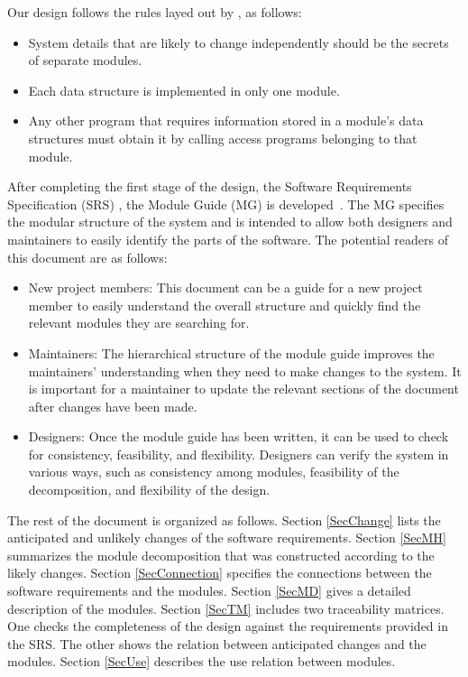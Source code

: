 \documentclass[12pt, titlepage]{article}
\begin{document}
Our design follows the rules layed out by \citet{ParnasEtAl1984}, as follows:
\begin{itemize}
\item System details that are likely to change independently should be the
  secrets of separate modules.
\item Each data structure is implemented in only one module.
\item Any other program that requires information stored in a module's data
  structures must obtain it by calling access programs belonging to that module.
\end{itemize}

After completing the first stage of the design, the Software Requirements
Specification (SRS) \citep{SRS-Sanskrit-Ciphers}, the Module Guide (MG) is developed~\citep{ParnasEtAl1984}. The MG
specifies the modular structure of the system and is intended to allow both
designers and maintainers to easily identify the parts of the software.  The
potential readers of this document are as follows:

\begin{itemize}
\item New project members: This document can be a guide for a new project member
  to easily understand the overall structure and quickly find the
  relevant modules they are searching for.
\item Maintainers: The hierarchical structure of the module guide improves the
  maintainers' understanding when they need to make changes to the system. It is
  important for a maintainer to update the relevant sections of the document
  after changes have been made.
\item Designers: Once the module guide has been written, it can be used to
  check for consistency, feasibility, and flexibility. Designers can verify the
  system in various ways, such as consistency among modules, feasibility of the
  decomposition, and flexibility of the design.
\end{itemize}

The rest of the document is organized as follows. Section
\ref{SecChange} lists the anticipated and unlikely changes of the software
requirements. Section \ref{SecMH} summarizes the module decomposition that
was constructed according to the likely changes. Section \ref{SecConnection}
specifies the connections between the software requirements and the
modules. Section \ref{SecMD} gives a detailed description of the
modules. Section \ref{SecTM} includes two traceability matrices. One checks
the completeness of the design against the requirements provided in the SRS. The
other shows the relation between anticipated changes and the modules. Section
\ref{SecUse} describes the use relation between modules.
\end{document}
